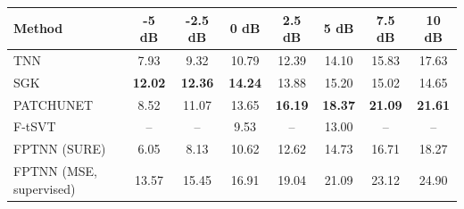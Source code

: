 \begin{tabular}{lccccccc}
\hline
Method & -5 dB & -2.5 dB & 0 dB & 2.5 dB & 5 dB & 7.5 dB & 10 dB \\
\hline
TNN & 7.93 & 9.32 & 10.79 & 12.39 & 14.10 & 15.83 & 17.63 \\
SGK & \textbf{12.02} & \textbf{12.36} & \textbf{14.24} & 13.88 & 15.20 & 15.02 & 14.65 \\
PATCHUNET & 8.52 & 11.07 & 13.65 & \textbf{16.19} & \textbf{18.37} & \textbf{21.09} & \textbf{21.61} \\
F-tSVT & -- & -- & 9.53 & -- & 13.00 & -- & -- \\
FPTNN (SURE) & 6.05 & 8.13 & 10.62 & 12.62 & 14.73 & 16.71 & 18.27 \\
FPTNN (MSE, supervised) & 13.57 & 15.45 & 16.91 & 19.04 & 21.09 & 23.12 & 24.90 \\
\hline
\end{tabular}
